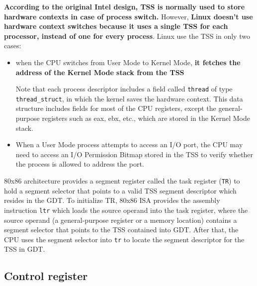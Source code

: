 \documentclass[10pt,a4paper]{article}
\begin{document}
\textbf{According to the original Intel design, TSS is normally used to store hardware contexts in case of process switch.} However, \textbf{Linux doesn't use hardware context switches because it uses a single TSS for each processor, instead of one for every process}. Linux use the TSS in only two cases:

\begin{itemize}
\item when the CPU switches from User Mode to Kernel Mode, \textbf{it fetches the address of the Kernel Mode stack from the TSS} 

Note that each process descriptor includes a field called \texttt{thread} of type \texttt{thread\_struct}, in
which the kernel saves the hardware context. This data structure includes fields for most of the CPU registers, except the general-purpose registers such as eax, ebx, etc., which are stored in the Kernel Mode stack.
\item When a User Mode process attempts to access an I/O port, the CPU may need to access an I/O Permission Bitmap stored in the TSS to verify whether the process is allowed to address the port.
\end{itemize}

80x86 architecture provides a segment register called the task register (\texttt{TR}) to hold a segment selector that points to a valid TSS segment descriptor which resides in the GDT. To initialize TR, 80x86 ISA provides the assembly instruction \texttt{ltr} which loads the source operand into the task register, where the source operand (a general-purpose register or a memory location) contains a segment selector that points to the TSS contained into GDT. After that, the CPU uses the segment selector into \texttt{tr} to locate the segment descriptor for the TSS in GDT.

\subsection{Control register}
\end{document}
